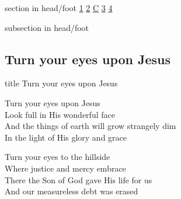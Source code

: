 \documentclass{beamer}
\begin{document}
{
{ 
 {
 \begin{beamercolorbox}[ht=4.5ex,dp=1.5ex,%
      leftskip=.3cm,rightskip=.3cm plus1fil]{section in head/foot}
 \fontsize{12}{25}\selectfont 
\hyperlink{Turn your eyes upon Jesus[]1}{1}
\hyperlink{Turn your eyes upon Jesus[]2}{2}
\hyperlink{Turn your eyes upon Jesus[]C}{C}
\hyperlink{Turn your eyes upon Jesus[]3}{3}
\hyperlink{Turn your eyes upon Jesus[]4}{4}
 
 \end{beamercolorbox}%
  \begin{beamercolorbox}[ht=2.5ex,dp=1.125ex,%
   leftskip=.3cm,rightskip=.3cm plus1fil]{subsection in head/foot}
   \insertauthor
 \end{beamercolorbox}%
 }
}
\subsection{ Turn your eyes upon Jesus }

\hypertarget{Turn your eyes upon Jesus[]}{}
\begin{frame}{}
 \vfill
  \centering
  \begin{beamercolorbox}[sep=8pt,center,shadow=true,rounded=true]{title}
    Turn your eyes upon Jesus    
  \end{beamercolorbox}
  \vfill
\end{frame}

\hypertarget{Turn your eyes upon Jesus[]1}{}
\begin{frame}{}
\fontsize{ 15 }{ 19 }\selectfont

Turn your eyes upon Jesus\\ 
Look full in His wonderful face\\ 
And the things of earth will grow strangely dim\\ 
In the light of His glory and grace 

\end{frame}

\hypertarget{Turn your eyes upon Jesus[]2}{}
\begin{frame}{}
\fontsize{ 15 }{ 19 }\selectfont

Turn your eyes to the hillside\\ 
Where justice and mercy embrace\\ 
There the Son of God gave His life for us\\ 
And our measureless debt was erased 


\end{frame}}
\end{document}
